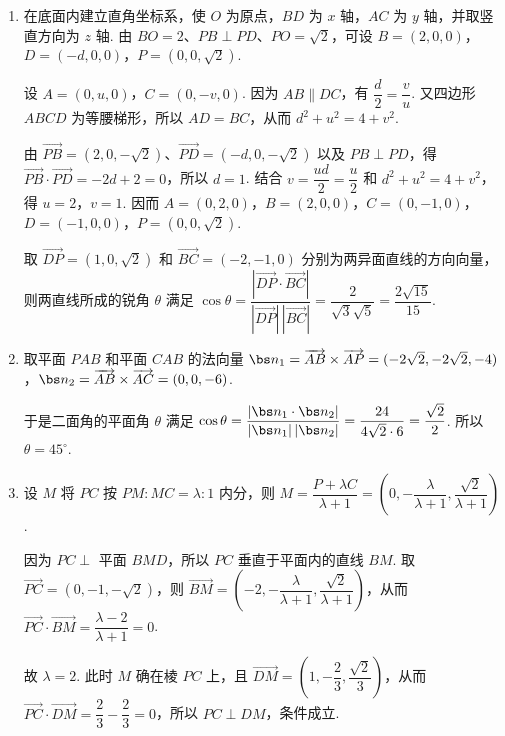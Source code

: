 \begin{solution}
\begin{enumerate}
\item 在底面内建立直角坐标系，使 \(O\) 为原点，\(BD\) 为 \(x\) 轴，\(AC\) 为 \(y\) 轴，并取竖直方向为 \(z\) 轴. 由 \(BO=2\)、\(PB\perp PD\)、\(PO=\sqrt{2}\)，可设 \(B=(2,0,0)\)，\(D=(-d,0,0)\)，\(P=(0,0,\sqrt{2})\).

设 \(A=(0,u,0)\)，\(C=(0,-v,0)\). 因为 \(AB\parallel DC\)，有 \(\dfrac{d}{2}=\dfrac{v}{u}\). 又四边形 \(ABCD\) 为等腰梯形，所以 \(AD=BC\)，从而 \(d^2+u^2=4+v^2\).

由 \(\overrightarrow{PB}=(2,0,-\sqrt{2})\)、\(\overrightarrow{PD}=(-d,0,-\sqrt{2})\) 以及 \(PB\perp PD\)，得 \(\overrightarrow{PB}\cdot\overrightarrow{PD}=-2d+2=0\)，所以 \(d=1\). 结合 \(v=\dfrac{ud}{2}=\dfrac{u}{2}\) 和 \(d^2+u^2=4+v^2\)，得 \(u=2\)，\(v=1\). 因而 \(A=(0,2,0)\)，\(B=(2,0,0)\)，\(C=(0,-1,0)\)，\(D=(-1,0,0)\)，\(P=(0,0,\sqrt{2})\).

取 \(\overrightarrow{DP}=(1,0,\sqrt{2})\) 和 \(\overrightarrow{BC}=(-2,-1,0)\) 分别为两异面直线的方向向量，则两直线所成的锐角 \(\theta\) 满足 \(\cos\theta=\dfrac{|\overrightarrow{DP}\cdot\overrightarrow{BC}|}{|\overrightarrow{DP}|\,|\overrightarrow{BC}|}=\dfrac{2}{\sqrt{3}\sqrt{5}}=\dfrac{2\sqrt{15}}{15}\).
\item 取平面 \(PAB\) 和平面 \(CAB\) 的法向量 \(\bs n_1=\overrightarrow{AB}\times\overrightarrow{AP}=(-2\sqrt{2},-2\sqrt{2},-4)\)，\(\bs n_2=\overrightarrow{AB}\times\overrightarrow{AC}=(0,0,-6)\).

于是二面角的平面角 \(\theta\) 满足 \(\cos\theta=\dfrac{|\bs n_1\cdot\bs n_2|}{|\bs n_1|\,|\bs n_2|}=\dfrac{24}{4\sqrt{2}\cdot6}=\dfrac{\sqrt{2}}{2}\). 所以 \(\theta=45^\circ\).
\item 设 \(M\) 将 \(PC\) 按 \(PM:MC=\lambda:1\) 内分，则 \(M=\dfrac{P+\lambda C}{\lambda+1}=\left(0,-\dfrac{\lambda}{\lambda+1},\dfrac{\sqrt{2}}{\lambda+1}\right)\).

因为 \(PC\perp\) 平面 \(BMD\)，所以 \(PC\) 垂直于平面内的直线 \(BM\). 取 \(\overrightarrow{PC}=(0,-1,-\sqrt{2})\)，则 \(\overrightarrow{BM}=\left(-2,-\dfrac{\lambda}{\lambda+1},\dfrac{\sqrt{2}}{\lambda+1}\right)\)，从而 \(\overrightarrow{PC}\cdot\overrightarrow{BM}=\dfrac{\lambda-2}{\lambda+1}=0\).

故 \(\lambda=2\). 此时 \(M\) 确在棱 \(PC\) 上，且
\(\overrightarrow{DM}=\left(1,-\dfrac{2}{3},\dfrac{\sqrt{2}}{3}\right)\)，从而
\(\overrightarrow{PC}\cdot\overrightarrow{DM}=\dfrac{2}{3}-\dfrac{2}{3}=0\)，所以 \(PC\perp DM\)，条件成立.
\end{enumerate}
\end{solution}

